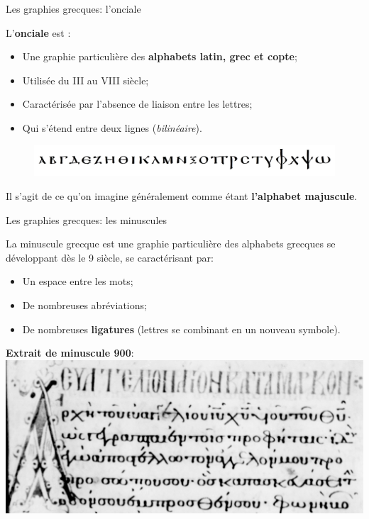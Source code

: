 \documentclass[11pt]{beamer}
\begin{document}
\begin{frame}{Les graphies grecques: l'onciale}
\begin{alertblock}{}
    L’\textbf{onciale} est :
    \begin{itemize}
        \item Une graphie particulière des \textbf{alphabets latin, grec et copte};
        \item Utilisée du III\ieme{} au VIII\ieme{} siècle;
        \item Caractérisée par l'absence de liaison entre les lettres;
        \item Qui s'étend entre deux lignes (\emph{bilinéaire}).
    \end{itemize}
\end{alertblock}
\begin{figure}
    \centering
    \includegraphics[width=0.8\linewidth]{img/majuscule_alphabet.jpg}
\end{figure}
\pause
    \begin{block}{}
        Il s'agit de ce qu'on imagine généralement comme étant \textbf{l'alphabet majuscule}.
    \end{block}
\end{frame}

\begin{frame}{Les graphies grecques: les minuscules}
    \begin{alertblock}{}
        La minuscule grecque est une graphie particulière des alphabets grecques se développant dès le 9\ieme{} siècle, se caractérisant par:
        \begin{itemize}
            \item Un espace entre les mots;
            \item De nombreuses abréviations;
            \item De nombreuses \textbf{ligatures} (lettres se combinant en un nouveau symbole).
        \end{itemize}
    \end{alertblock}

\textbf{Extrait de minuscule 900}:\\

    \centering
    \includegraphics[width=0.5\linewidth]{img/minuscule_900.png}
\end{frame}
\end{document}
